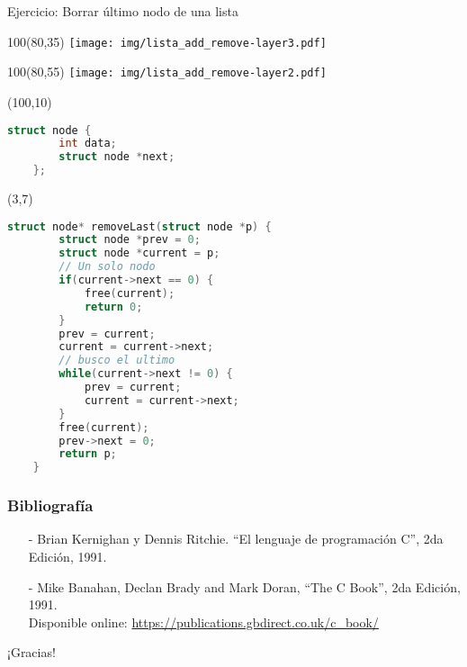\documentclass[aspectratio=169]{beamer}
\begin{document}
\begin{frame}[fragile]{Ejercicio: Borrar último nodo de una lista}
    \begin{textblock}{100}(80,35) \texttt{[image: img/lista\_add\_remove-layer3.pdf]} \end{textblock}
    \begin{textblock}{100}(80,55) \texttt{[image: img/lista\_add\_remove-layer2.pdf]} \end{textblock}
    \begin{textblock}{60}(100,10)
    \small
    \begin{lstlisting}[language=C,basicstyle=\ttfamily,columns=fullflexible]
    struct node {
        int data;
        struct node *next;
    };
    \end{lstlisting}
    \end{textblock}
    \begin{textblock}{90}(3,7)
    \small
    \begin{lstlisting}[language=C,basicstyle=\ttfamily,columns=fullflexible]
    struct node* removeLast(struct node *p) {
        struct node *prev = 0;
        struct node *current = p;
        // Un solo nodo
        if(current->next == 0) {
            free(current);
            return 0;
        }
        prev = current;
        current = current->next;
        // busco el ultimo
        while(current->next != 0) {
            prev = current;
            current = current->next;
        }
        free(current);
        prev->next = 0;
        return p;
    }
    \end{lstlisting}
    \end{textblock}
\end{frame}

\begin{frame}[fragile]
    \frametitle{Bibliografía}
    \begin{itemize}
     \setlength\itemsep{0.5cm}
      \item[-] \small Brian Kernighan y Dennis Ritchie. “El lenguaje de programación C”, 2da Edición, 1991.\\
      \item[-] \small Mike Banahan, Declan Brady and Mark Doran, “The C Book”, 2da Edición, 1991.\\
      Disponible online: \url{https://publications.gbdirect.co.uk/c_book/}
    \end{itemize}
\end{frame}

\begin{frame}[plain]
    \begin{center}
    \vspace{2cm}
    \huge ¡Gracias!\\
    \vspace{2cm}
    \end{center}
\end{frame}
\end{document}
